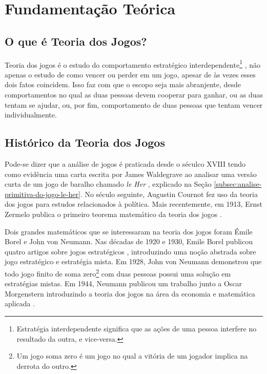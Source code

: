 \chapter[Fundamentação Teórica]{Fundamentação Teórica}
\label{cha:fundamentacao-teorica}

\section{O que é Teoria dos Jogos?}
\label{sec:o-que-e-teoria-dos-jogos}

Teoria dos jogos é o estudo do comportamento estratégico interdependente\footnote{Estratégia interdependente significa que as ações de uma pessoa interfere no resultado da outra, e vice-versa.} \cite{spaniel_2011}, não apenas o estudo de como vencer ou perder em um jogo, apesar de às vezes esses dois fatos coincidem. Isso faz com que o escopo seja mais abranjente, desde comportamentos no qual as duas pessoas devem cooperar para ganhar, ou as duas tentam se ajudar, ou, por fim, comportamento de duas pessoas que tentam vencer individualmente.

\section{Histórico da Teoria dos Jogos}
\label{sec:historico-da-teoria-dos-jogos}

Pode-se dizer que a análise de jogos é praticada desde o séculco XVIII tendo como evidência uma carta escrita por James Waldegrave ao analisar uma versão curta de um jogo de baralho chamado \emph{le Her} \cite[p.~2]{Prague_severalmilestones}, explicado na Seção \ref{subsec:analise-primitiva-do-jogo-le-her}. No século seguinte, Augustin Cournot fez uso da teoria dos jogos para estudos relacionados à política. Mais recentemente, em 1913, Ernst Zermelo publica o primeiro teorema matemático da teoria dos jogos \cite[p.~2]{sartini_IIbienaldasbm}.

Dois grandes matemáticos que se interessaram na teoria dos jogos foram Émile Borel e John von Neumann. Nas décadas de 1920 e 1930, Emile Borel publicou quatro artigos sobre jogos estratégicos \cite[p.~2]{Prague_severalmilestones}, introduzindo uma noção abstrada sobre jogo estratégico e estratégia mista. Em 1928, John von Neumann demonstrou que todo jogo finito de soma zero\footnote{Um jogo soma zero é um jogo no qual a vitória de um jogador implica na derrota do outro.} com duas pessoas possui uma solução em estratégias mistas. Em 1944, Neumann publicou um trabalho junto a Oscar Morgenstern introduzindo a teoria dos jogos na área da economia e matemática aplicada \cite[p.~2--3]{sartini_IIbienaldasbm}.

